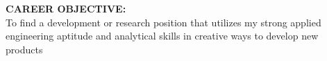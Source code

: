 


{\large \textbf{CAREER OBJECTIVE:}}\\
To find a development or research position that utilizes my strong applied engineering aptitude and analytical skills in creative ways to develop new products \bigskip 








% 

\pagebreak

% 





